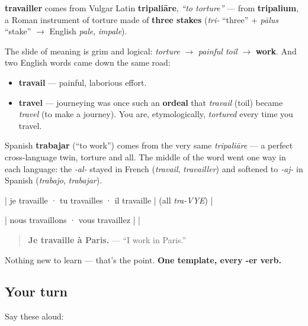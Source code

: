 \begin{cousinweb}
\textbf{travailler} comes from Vulgar Latin \textbf{tripaliāre}, \emph{\textquotedblleft{}to torture\textquotedblright{}} — from \textbf{tripalium}, a Roman instrument of torture made of \textbf{three stakes} (\emph{tri-} \textquotedblleft{}three\textquotedblright{} + \emph{pālus} \textquotedblleft{}stake\textquotedblright{} $\to$ English \emph{pale}, \emph{impale}).

The slide of meaning is grim and logical: \emph{torture} $\to$ \emph{painful toil} $\to$ \textbf{work}. And two English words came down the same road:

\begin{itemize}
\raggedright
  \item \textbf{travail} — painful, laborious effort.
  \item \textbf{travel} — journeying was once such an \textbf{ordeal} that \emph{travail} (toil) became \emph{travel} (to make a journey). You are, etymologically, \emph{tortured} every time you travel.
\end{itemize}
\end{cousinweb}

\begin{culture}
Spanish \textbf{trabajar} (\textquotedblleft{}to work\textquotedblright{}) comes from the very same \emph{tripaliāre} — a perfect cross-language twin, torture and all. The middle of the word went one way in each language: the \emph{-al-} stayed in French (\emph{travail}, \emph{travailler}) and softened to \emph{-aj-} in Spanish (\emph{trabajo}, \emph{trabajar}).
\end{culture}

\begin{grammarlens}[title={Grammar Lens: same -er template}]
| je travaille · tu travailles · il travaille | (all \emph{tra-VYE}) |

| nous travaillons · vous travaillez |  |

\begin{quote}
\textbf{Je travaille à Paris.} — \textquotedblleft{}I work in Paris.\textquotedblright{}
\end{quote}

Nothing new to learn — that's the point. \textbf{One template, every -er verb.}
\end{grammarlens}

\subsection*{Your turn}
Say these aloud:

